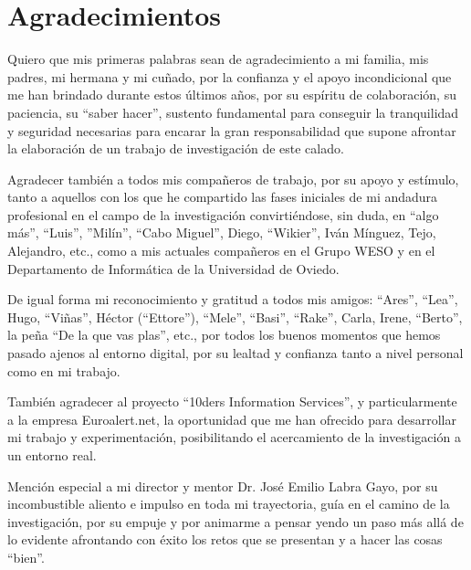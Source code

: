 %
%

\chapter*{Agradecimientos}
Quiero que mis primeras palabras sean de agradecimiento a mi familia, mis padres, mi
hermana y mi cuñado, por la confianza y el apoyo incondicional que me han brindado
durante estos últimos años, por su espíritu de colaboración, su paciencia, su ``saber
hacer'', sustento fundamental para conseguir la tranquilidad y seguridad necesarias para
encarar la gran responsabilidad que supone afrontar la elaboración de un trabajo de
investigación de este calado.

Agradecer también a todos mis compañeros de trabajo, por su apoyo y estímulo, tanto a
aquellos con los que he compartido las fases iniciales de mi andadura profesional en el
campo de la investigación convirtiéndose, sin duda, en ``algo más'', ``Luis'', ''Milín'', ``Cabo 
Miguel'', Diego, ``Wikier'', Iván Mínguez, Tejo, Alejandro, etc., como a mis actuales
compañeros en el Grupo WESO y en el Departamento de Informática de la Universidad
de Oviedo.

De igual forma mi reconocimiento y gratitud a todos mis amigos: ``Ares'', ``Lea'',
Hugo, ``Viñas'', Héctor (``Ettore''), ``Mele'', ``Basi'', ``Rake'', Carla, Irene, ``Berto'', la peña ``De la que vas
plas'', etc., por todos los buenos momentos que hemos pasado ajenos al entorno digital,
por su lealtad y confianza tanto a nivel personal como en mi trabajo.

También agradecer al proyecto ``10ders Information Services'', y particularmente a la
empresa Euroalert.net, la oportunidad que me han ofrecido para desarrollar mi trabajo y
experimentación, posibilitando el acercamiento de la investigación a un entorno real.

Mención especial a mi director y mentor Dr. José Emilio Labra Gayo, por su
incombustible aliento e impulso en toda mi trayectoria, guía en el camino de la
investigación, por su empuje y por animarme a pensar yendo un paso más allá de lo
evidente afrontando con éxito los retos que se presentan y a hacer las cosas ``bien''.



